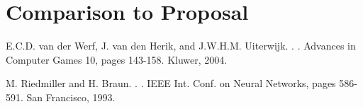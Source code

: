 \documentclass[11pt,letterpaper]{article}
\begin{document}
\section{Comparison to Proposal}

\begin{thebibliography}{}

E.C.D. van der Werf, J. van den Herik, and J.W.H.M. Uiterwijk.
.
.
\newblock Advances in Computer Games 10, pages 143-158.
\newblock Kluwer, 2004.

M. Riedmiller and H. Braun.
.
.
\newblock IEEE Int. Conf. on Neural Networks, pages 586-591.
\newblock San Francisco, 1993.

\end{thebibliography}
\end{document}
